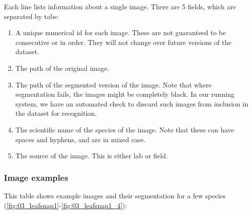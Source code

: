\documentclass[../Main.tex]{subfiles}
\begin{document}
    Each line lists information about a single image. There are 5 fields, which are separated by tabs:
    \begin{enumerate}
        \item A unique numerical id for each image. These are not guaranteed to be consecutive or in order. They will not change over future versions of the dataset.
        \item The path of the original image.
        \item The path of the segmented version of the image. Note that where segmentation fails, the images might be completely black. In our running system, we have an automated check to discard such images from inclusion in the dataset for recognition.
        \item The scientific name of the species of the image. Note that these can have spaces and hyphens, and are in mixed case.
        \item The source of the image. This is either lab or field.
    \end{enumerate}
    
    \subsubsection{Image examples}
    This table shows example images and their segmentation for a few species (\ref{fig:03_leafsnap1}-\ref{fig:03_leafsnap1_4}):
    
\end{document}
